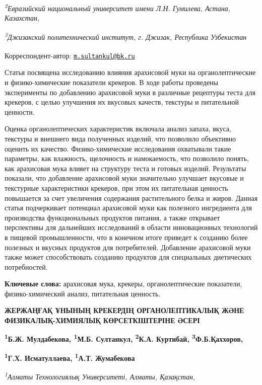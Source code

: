 {{{\emph{\textsuperscript{2}Евразийский национальный университет имени Л.Н.
Гумилева, Астана, Казахстан,}

\emph{\textsuperscript{3}Джизакский политехнический институт, г. Джизак,
Республика Узбекистан}

{\bfseries \textsuperscript{\envelope }}Корреспондент-автор:
\href{mailto:m.sultankul@bk.ru}{\nolinkurl{m.sultankul@bk.ru}}

Статья посвящена исследованию влияния арахисовой муки на
органолептические и физико-химические показатели крекеров. В ходе работы
проведены эксперименты по добавлению арахисовой муки в различные
рецептуры теста для крекеров, с целью улучшения их вкусовых качеств,
текстуры и питательной ценности.

Оценка органолептических характеристик включала анализ запаха, вкуса,
текстуры и внешнего вида полученных изделий, что позволило объективно
оценить их качество. Физико-химические исследования охватывали такие
параметры, как влажность, щелочность и намокаемость, что позволило
понять, как арахисовая мука влияет на структуру теста и готовых изделий.
Результаты показали, что добавление арахисовой муки значительно улучшает
вкусовые и текстурные характеристики крекеров, при этом их питательная
ценность повышается за счет увеличения содержания растительного белка и
жиров. Данная статья подчеркивает потенциал арахисовой муки как
полезного ингредиента для производства функциональных продуктов питания,
а также открывает перспективы для дальнейших исследований в области
инновационных технологий в пищевой промышленности, что в конечном итоге
приведет к созданию более полезных и вкусных продуктов для потребителей.
Добавление арахисовой муки также может способствовать созданию продуктов
для специальных диетических потребностей.

{\bfseries Ключевые слова:} арахисовая мука, крекеры, органолептические
показатели, физико-химический анализ, питательная ценность.

{\bfseries ЖЕРЖАҢҒАҚ ҰНЫНЫҢ КРЕКЕРДІҢ ОРГАНОЛЕПТИКАЛЫҚ ЖӘНЕ
ФИЗИКАЛЫҚ-ХИМИЯЛЫҚ КӨРСЕТКІШТЕРІНЕ ӘСЕРІ}

{\bfseries \textsuperscript{1}Б.Ж. Мулдабекова, \textsuperscript{1}М.Б.
Султанкул\textsuperscript{\envelope }, \textsuperscript{2}К.А. Куртибай,
\textsuperscript{3}Ф.Б.Қаххоров,}

{\bfseries \textsuperscript{1}Г.Х. Исматуллаева, \textsuperscript{1}А.Т.
Жумабекова}

\emph{\textsuperscript{1}Алматы Технологиялық Университеті, Алматы,
Қазақстан,}

}}}
